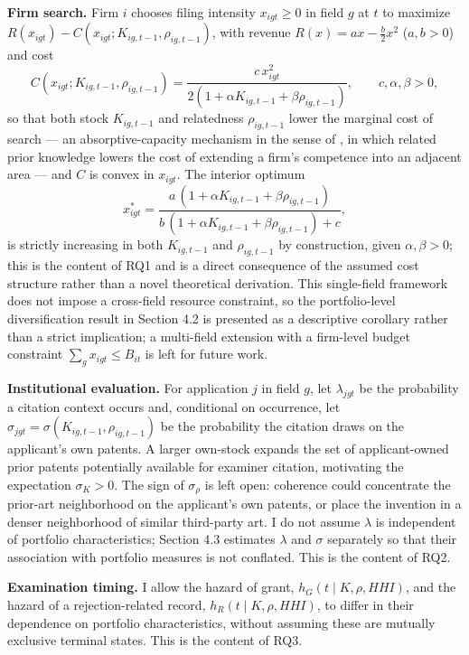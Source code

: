 \documentclass[12pt]{article}
\begin{document}
\textbf{Firm search.} Firm $i$ chooses filing intensity $x_{igt} \geq 0$ in field $g$ at $t$ to maximize $R(x_{igt}) - C(x_{igt}; K_{ig,t-1}, \rho_{ig,t-1})$, with revenue $R(x) = ax - \tfrac{b}{2}x^2$ ($a,b>0$) and cost
\begin{equation}
C(x_{igt}; K_{ig,t-1}, \rho_{ig,t-1}) = \frac{c\,x_{igt}^2}{2(1+\alpha K_{ig,t-1} + \beta \rho_{ig,t-1})}, \qquad c,\alpha,\beta>0,
\end{equation}
so that both stock $K_{ig,t-1}$ and relatedness $\rho_{ig,t-1}$ lower the marginal cost of search --- an absorptive-capacity mechanism in the sense of \citet{cohenlevinthal1990}, in which related prior knowledge lowers the cost of extending a firm's competence into an adjacent area --- and $C$ is convex in $x_{igt}$. The interior optimum
\begin{equation}
x_{igt}^{*} = \frac{a\,(1+\alpha K_{ig,t-1}+\beta\rho_{ig,t-1})}{b\,(1+\alpha K_{ig,t-1}+\beta\rho_{ig,t-1}) + c},
\end{equation}
is strictly increasing in both $K_{ig,t-1}$ and $\rho_{ig,t-1}$ by construction, given $\alpha,\beta>0$; this is the content of RQ1 and is a direct consequence of the assumed cost structure rather than a novel theoretical derivation. This single-field framework does not impose a cross-field resource constraint, so the portfolio-level diversification result in Section 4.2 is presented as a descriptive corollary rather than a strict implication; a multi-field extension with a firm-level budget constraint $\sum_g x_{igt} \leq B_{it}$ is left for future work.

\textbf{Institutional evaluation.} For application $j$ in field $g$, let $\lambda_{jgt}$ be the probability a citation context occurs and, conditional on occurrence, let $\sigma_{jgt}=\sigma(K_{ig,t-1},\rho_{ig,t-1})$ be the probability the citation draws on the applicant's own patents. A larger own-stock expands the set of applicant-owned prior patents potentially available for examiner citation, motivating the expectation $\sigma_K>0$. The sign of $\sigma_\rho$ is left open: coherence could concentrate the prior-art neighborhood on the applicant's own patents, or place the invention in a denser neighborhood of similar third-party art. I do not assume $\lambda$ is independent of portfolio characteristics; Section 4.3 estimates $\lambda$ and $\sigma$ separately so that their association with portfolio measures is not conflated. This is the content of RQ2.

\textbf{Examination timing.} I allow the hazard of grant, $h_G(t\mid K,\rho,HHI)$, and the hazard of a rejection-related record, $h_R(t\mid K,\rho,HHI)$, to differ in their dependence on portfolio characteristics, without assuming these are mutually exclusive terminal states. This is the content of RQ3.
\end{document}
